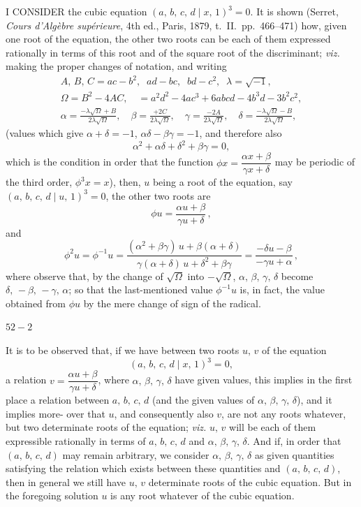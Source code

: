 \documentclass[11pt]{article}
\begin{document}
\noindent
I CONSIDER the cubic equation $(a,\,b,\,c,\,d \mid x,\,1)^{3} = 0$. It is shown (Serret,
\textit{Cours d'Alg\`ebre sup\'erieure}, 4th ed., Paris, 1879, t.\ II.\ pp.\ 466--471) how, given one
root of the equation, the other two roots can be each of them expressed rationally
in terms of this root and of the square root of the discriminant; \emph{viz.} making
the proper changes of notation, and writing
\begin{gather*}
  A,\,B,\,C = ac - b^{2},\;\; ad - bc,\;\; bd - c^{2},\;\; \lambda = \sqrt{-1},\\
  \Omega = B^{2} - 4AC,\quad
   = a^{2} d^{2} - 4 a c^{3} + 6 a b c d - 4 b^{3} d - 3 b^{2} c^{2},\\
  \alpha = \frac{-\lambda \sqrt{\Omega} + B}{2 \lambda \sqrt{\Omega}},\quad
  \beta = \frac{+ 2 C}{2 \lambda \sqrt{\Omega}},\quad
  \gamma = \frac{- 2 A}{2 \lambda \sqrt{\Omega}},\quad
  \delta = \frac{- \lambda \sqrt{\Omega} - B}{2 \lambda \sqrt{\Omega}},
\end{gather*}
(values which give $\alpha + \delta = -1$, $\alpha \delta - \beta \gamma = -1$, and therefore also
\[
  \alpha^{2} + \alpha \delta + \delta^{2} + \beta \gamma = 0,
\]
which is the condition in order that the function
$\phi x = \dfrac{\alpha x + \beta}{\gamma x + \delta}$ may be periodic of the third order,
$\phi^{3} x = x$), then, $u$ being a root of the equation, say $(a,\,b,\,c,\,d \mid u,\,1)^{3} = 0$, the
other two roots are
\[
  \phi u = \frac{\alpha u + \beta}{\gamma u + \delta}\,,
\]
and
\[
  \phi^{2} u = \phi^{-1} u
   = \frac{(\alpha^{2} + \beta \gamma)\,u + \beta(\alpha + \delta)}{\gamma(\alpha + \delta)\,u + \delta^{2} + \beta \gamma}
   = \frac{- \delta u - \beta}{- \gamma u + \alpha}\,,
\]
where observe that, by the change of $\sqrt{\Omega}$ into $-\sqrt{\Omega}$,
$\alpha,\,\beta,\,\gamma,\,\delta$ become $\delta,\,-\beta,\,-\gamma,\,\alpha$;
so that the last-mentioned value $\phi^{-1} u$ is, in fact, the value obtained from $\phi u$ by the
mere change of sign of the radical.

\hfill $52{-}2$

It is to be observed that, if we have between two roots $u,\,v$ of the equation
\[
  (a,\,b,\,c,\,d \mid x,\,1)^{3} = 0,
\]
a relation $v = \dfrac{\alpha u + \beta}{\gamma u + \delta}$, where $\alpha,\,\beta,\,\gamma,\,\delta$ have given values, this implies in the first place
a relation between $a,\,b,\,c,\,d$ (and the given values of $\alpha,\,\beta,\,\gamma,\,\delta$), and it implies more-
over that $u$, and consequently also $v$, are not any roots whatever, but two determinate
roots of the equation; \emph{viz.} $u,\,v$ will be each of them expressible rationally in terms
of $a,\,b,\,c,\,d$ and $\alpha,\,\beta,\,\gamma,\,\delta$. And if, in order that $(a,\,b,\,c,\,d)$ may remain arbitrary,
we consider $\alpha,\,\beta,\,\gamma,\,\delta$ as given quantities satisfying the relation which exists between
these quantities and $(a,\,b,\,c,\,d)$, then in general we still have $u,\,v$ determinate roots
of the cubic equation. But in the foregoing solution $u$ is any root whatever of the
cubic equation.
\end{document}
